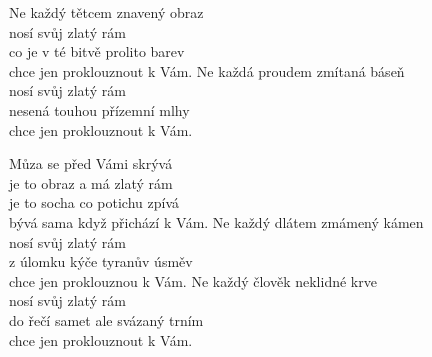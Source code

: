 
\ve
Ne každý tětcem znavený obraz\\
nosí svůj zlatý rám\\
co je v té bitvě prolito barev\\
chce jen proklouznout k Vám.
\ve
Ne každá proudem zmítaná báseň\\
nosí svůj zlatý rám\\
nesená touhou přízemní mlhy\\
chce jen proklouznout k Vám.

\cho
{}Můza se před Vámi skrývá\\
je to obraz a má zlatý rám\\
je to socha co potichu zpívá\\
bývá sama když přichází k Vám. 
\ve
Ne každý dlátem zmámený kámen\\
nosí svůj zlatý rám\\
z úlomku kýče tyranův úsměv\\
chce jen proklouznou k Vám.
\ve
Ne každý člověk neklidné krve\\
nosí svůj zlatý rám\\
do řečí samet ale svázaný trním\\
chce jen proklouznout k Vám.

\esong
